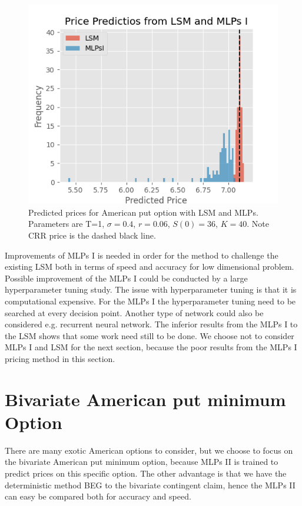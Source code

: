 \begin{figure}[th]
\centering
\includegraphics{Figures/histLSMMLPsI.png}
\decoRule
\caption[Histogram Price Predictions]{Predicted prices for American put option with LSM and MLPs. Parameters are T=1, $\sigma=0.4$, $r=0.06$, $S(0)=36$, $K=40$. Note CRR price is the dashed black line.}
\label{fig:histLSMMLPsI}
\end{figure}

Improvements of MLPs I is needed in order for the method to challenge the existing LSM both in terms of speed and accuracy for low dimensional problem. Possible improvement of the MLPs I could be conducted by a large hyperparameter tuning study. The issue with hyperparameter tuning is that it is computational expensive. For the MLPs I the hyperparameter tuning need to be searched at every decision point. Another type of network could also be considered e.g. recurrent neural network. The inferior results from the MLPs I to the LSM shows that some work need still to be done. We choose not to consider MLPs I and LSM for the next section, because the poor results from the MLPs I pricing method in this section.\\
\section{Bivariate American put minimum Option}\label{bivariateAmerPut}
There are many exotic American options to consider, but we choose to focus on the bivariate American put minimum option, because MLPs II is trained to predict prices on this specific option. The other advantage is that we have the deterministic method BEG to the bivariate contingent claim, hence the MLPs II can easy be compared both for accuracy and speed.\\

